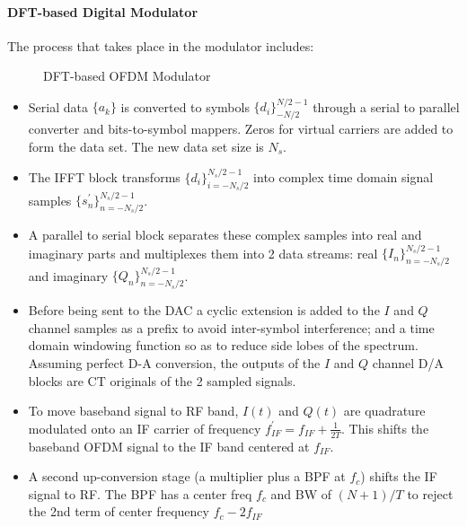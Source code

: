 \paragraph{\gls{DFT}-based Digital Modulator}
The process that takes place in the modulator includes\cite{fuqin}:
\begin{figure}[h!]
	\centerline{\resizebox{16cm}{!}{}}
	\caption{\gls{DFT}-based \gls{OFDM} Modulator}
	\label{fig:dft_mod}
\end{figure}
\begin{itemize}
	\item Serial data $\{ a_k\}$ is converted to symbols  $\{ d_i\}_{-N/2}^{N/2-1}$ through a serial to parallel converter and bits-to-symbol mappers. Zeros for virtual carriers are added to form the data set. The new data set size is $N_s$.
	\item The \gls{IFFT} block transforms $\{ d_i\}_{i=-N_s/2}^{N_s/2-1}$ into complex time domain signal samples $\{ s_n^\prime\}_{n=-N_s/2}^{N_s/2-1}$.
	\item A parallel to serial block separates these complex samples into real and imaginary parts and multiplexes them into 2 data streams: real $\{ I_n\}_{n=-N_s/2}^{N_s/2-1}$ and imaginary $\{ Q_n\}_{n=-N_s/2}^{N_s/2-1}$.
	\item Before being sent to the \gls{DAC} a cyclic extension is added to the $I$ and $Q$ channel samples as a prefix to avoid inter-symbol interference; and a time domain windowing function so as to reduce side lobes of the spectrum. Assuming perfect D-A conversion, the outputs of the $I$ and $Q$ channel D/A blocks are CT originals of the 2 sampled signals.
	\item To move baseband signal to RF band, $I(t)$ and $Q(t)$ are quadrature modulated onto an \gls{IF} carrier of frequency $f_{IF}^\prime = f_{IF} + \frac{1}{2T}$. This shifts the baseband \gls{OFDM} signal to the \gls{IF} band centered at $f_{IF}$.
	\item A second up-conversion stage (a multiplier plus a \gls{BPF} at $f_c$) shifts the \gls{IF} signal to \gls{RF}. The \gls{BPF} has a center freq $f_c$ and BW of $(N+1)/T$ to reject the 2nd term of center frequency $f_c-2f_{IF}$
\end{itemize}

